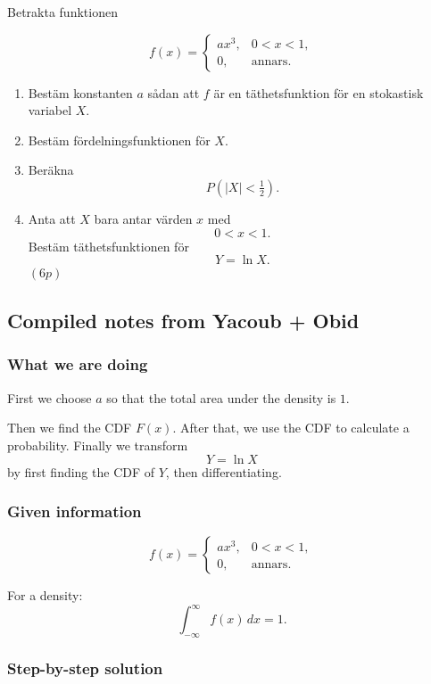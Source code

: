 \documentclass[10pt]{article}
\begin{document}
Betrakta funktionen

\[
f(x)=
\begin{cases}
ax^3,
& 0<x<1,\\
0,
& \text{annars}.
\end{cases}
\]

\begin{enumerate}[label=\alph*)]
\item Bestäm konstanten \(a\) sådan att \(f\) är en
täthetsfunktion för en stokastisk variabel \(X\).

\item Bestäm fördelningsfunktionen för \(X\).

\item Beräkna
\[
P(|X|<\tfrac12).
\]

\item Anta att \(X\) bara antar värden \(x\) med
\[
0<x<1.
\]
Bestäm täthetsfunktionen för
\[
Y=\ln X.
\]
\((6p)\)
\end{enumerate}

\subsection*{Compiled notes from Yacoub + Obid}

\subsubsection*{What we are doing}

First we choose \(a\) so that the total area under
the density is \(1\).

Then we find the CDF \(F(x)\). After that, we use the
CDF to calculate a probability. Finally we transform
\[
Y=\ln X
\]
by first finding the CDF of \(Y\), then differentiating.

\subsubsection*{Given information}

\[
f(x)=
\begin{cases}
ax^3,
& 0<x<1,\\
0,
& \text{annars}.
\end{cases}
\]

For a density:
\[
\int_{-\infty}^{\infty}f(x)\,dx=1.
\]

\subsubsection*{Step-by-step solution}
\end{document}

